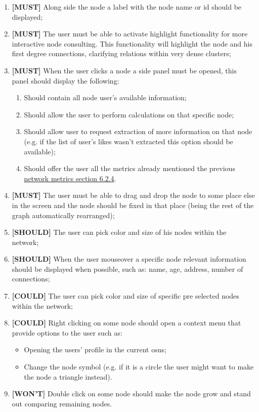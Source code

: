 \begin{enumerate}
    \item \textbf{[MUST]} Along side the node a label with the node name or id should be displayed;
    \item \textbf{[MUST]} The user must be able to activate highlight functionality for more interactive node consulting. This functionality will highlight the node
    and his first degree connections, clarifying relations within very dense clusters; %
    \item \textbf{[MUST]} When the user clicks a node a side panel must be opened, this panel should display the following:
    \begin{enumerate}
        \item Should contain all node user's available information;
        \item Should allow the user to perform calculations on that specific node;
        \item Should allow user to request extraction of more information on that node (e.g. if the list of user's likes wasn't extracted this option should be available);
        \item Should offer the user all the metrics already mentioned the previous \hyperref[subsec:networkmetrics]{network metrics section 6.2.4}.
    \end{enumerate}
    \item \textbf{[MUST]} The user must be able to drag and drop the node to some place else in the screen and the node should be fixed in that place (being the rest of the graph automatically rearranged); %
    \item \textbf{[SHOULD]} The user can pick color and size of his nodes within the network;
    \item \textbf{[SHOULD]} When the user mouseover a specific node relevant information should be displayed when possible, such as: name, age, address, number of connections;
    \item \textbf{[COULD]} The user can pick color and size of specific pre selected nodes within the network;
    \item \textbf{[COULD]} Right clicking on some node should open a context menu that provide options to the user such as:
    \begin{itemize}
        \item Opening the users' profile in the current \glspl{osn};
        \item Change the node symbol (e.g. if it is a circle the user might want to make the node a triangle instead). %
    \end{itemize}
    \item \textbf{[WON'T]} Double click on some node should make the node grow and stand out comparing remaining nodes. %
\end{enumerate}

